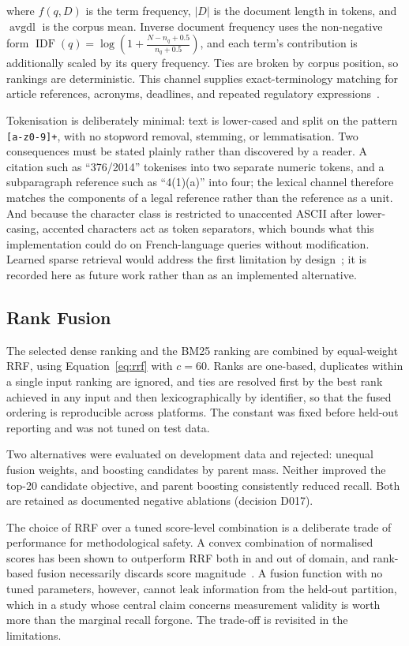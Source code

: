 where $f(q,D)$ is the term frequency, $|D|$ is the document length in tokens, and $\operatorname{avgdl}$ is the corpus mean. Inverse document frequency uses the non-negative form $\operatorname{IDF}(q) = \log\!\left(1 + \frac{N - n_q + 0.5}{n_q + 0.5}\right)$, and each term's contribution is additionally scaled by its query frequency. Ties are broken by corpus position, so rankings are deterministic. This channel supplies exact-terminology matching for article references, acronyms, deadlines, and repeated regulatory expressions~\cite{robertson2009bm25}.

Tokenisation is deliberately minimal: text is lower-cased and split on the pattern \texttt{[a-z0-9]+}, with no stopword removal, stemming, or lemmatisation. Two consequences must be stated plainly rather than discovered by a reader. A citation such as ``376/2014'' tokenises into two separate numeric tokens, and a subparagraph reference such as ``4(1)(a)'' into four; the lexical channel therefore matches the components of a legal reference rather than the reference as a unit. And because the character class is restricted to unaccented ASCII after lower-casing, accented characters act as token separators, which bounds what this implementation could do on French-language queries without modification. Learned sparse retrieval would address the first limitation by design~\cite{formal2021splade}; it is recorded here as future work rather than as an implemented alternative.

\subsection{Rank Fusion}

The selected dense ranking and the BM25 ranking are combined by equal-weight \ac{RRF}, using Equation~\ref{eq:rrf} with $c = 60$. Ranks are one-based, duplicates within a single input ranking are ignored, and ties are resolved first by the best rank achieved in any input and then lexicographically by identifier, so that the fused ordering is reproducible across platforms. The constant was fixed before held-out reporting and was not tuned on test data.

Two alternatives were evaluated on development data and rejected: unequal fusion weights, and boosting candidates by parent mass. Neither improved the top-20 candidate objective, and parent boosting consistently reduced recall. Both are retained as documented negative ablations (decision D017).

The choice of \ac{RRF} over a tuned score-level combination is a deliberate trade of performance for methodological safety. A convex combination of normalised scores has been shown to outperform \ac{RRF} both in and out of domain, and rank-based fusion necessarily discards score magnitude~\cite{bruch2024fusion}. A fusion function with no tuned parameters, however, cannot leak information from the held-out partition, which in a study whose central claim concerns measurement validity is worth more than the marginal recall forgone. The trade-off is revisited in the limitations.

